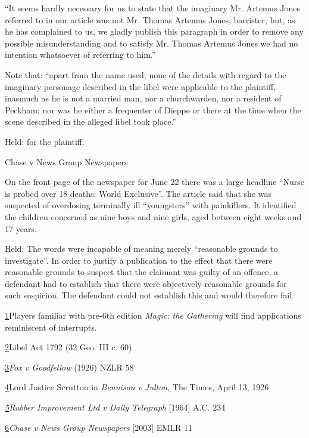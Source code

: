 \documentclass[]{article}
\begin{document}
``It seems hardly necessary for us to state that the imaginary Mr.
Artemus Jones referred to in our article was not Mr. Thomas Artemus
Jones, barrister, but, as he has complained to us, we gladly publish
this paragraph in order to remove any possible misunderstanding and to
satisfy Mr. Thomas Artemus Jones we had no intention whatsoever of
referring to him.''

Note that: ``apart from the name used, none of the details with regard
to the imaginary personage described in the libel were applicable to the
plaintiff, inasmuch as he is not a married man, nor a churchwarden, nor
a resident of Peckham; nor was he either a frequenter of Dieppe or there
at the time when the scene described in the alleged libel took place.''

Held: for the plaintiff.

Chase v News Group Newspapers

On the front page of the newspaper for June 22 there was a large
headline ``Nurse is probed over 18 deaths: World Exclusive''. The
article said that she was suspected of overdosing terminally ill
``youngsters'' with painkillers. It identified the children concerned as
nine boys and nine girls, aged between eight weeks and 17 years.

Held: The words were incapable of meaning merely ``reasonable grounds to
investigate''. In order to justify a publication to the effect that
there were reasonable grounds to suspect that the claimant was guilty of
an offence, a defendant had to establish that there were objectively
reasonable grounds for such suspicion. The defendant could not establish
this and would therefore fail.

\hyperref[sdfootnote1anc]{1}Players familiar with pre-6th edition
\emph{Magic: the Gathering} will find applications reminiscent of
interrupts.

\hyperref[sdfootnote2anc]{2}Libel Act 1792 (32 Geo. III c. 60)

\hyperref[sdfootnote3anc]{3}\emph{Fox v Goodfellow} (1926) NZLR 58

\hyperref[sdfootnote4anc]{4}Lord Justice Scrutton in \emph{Bennison v
Julton}{, The Times, April 13, 1926}

\emph{\hyperref[sdfootnote5anc]{5}Rubber Improvement Ltd v Daily
Telegraph}{ {[}1964{]} A.C. 234}

\hyperref[sdfootnote6anc]{6}\emph{Chase v News Group Newspapers}
{[}2003{]} EMLR 11
\end{document}
